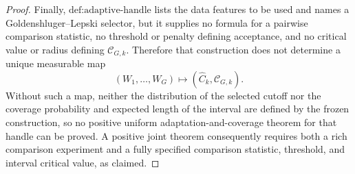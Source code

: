\documentclass{article}
\begin{document}
\begin{proof}
Finally, \(\text{def:adaptive-handle}\) lists the data features to be used and names a Goldenshluger--Lepski selector, but it supplies no formula for a pairwise comparison statistic, no threshold or penalty defining acceptance, and no critical value or radius defining \(\mathcal C_{G,k}\). Therefore that construction does not determine a unique measurable map
\[
 (W_1,\ldots,W_G)\longmapsto
 (\widehat C_k,\mathcal C_{G,k}).
\]
Without such a map, neither the distribution of the selected cutoff nor the coverage probability and expected length of the interval are defined by the frozen construction, so no positive uniform adaptation-and-coverage theorem for that handle can be proved. A positive joint theorem consequently requires both a rich comparison experiment and a fully specified comparison statistic, threshold, and interval critical value, as claimed.
\end{proof}
\end{document}
